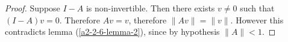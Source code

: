 \documentclass[12pt]{article}
\begin{document}
\begin{enumerate}[label=(\roman*)]
  \begin{proof}
    Suppose $I - A$ is non-invertible. Then there exists $v \neq 0$ such that $(I - A)v =
    0$. Therefore $Av = v$, therefore $\|Av\| = \|v\|$. However this contradicts lemma
    (\ref{a2-2-6-lemma-2}), since by hypothesis $\|A\| < 1$.
  \end{proof}




\end{enumerate}
\end{document}
